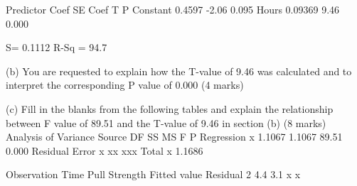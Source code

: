 	Predictor	Coef		SE Coef	T		P
	Constant			0.4597		-2.06		0.095
	Hours				0.09369	 9.46		0.000
	
	S= 0.1112	R-Sq = 94.7%
	
	
	(b) 	You are requested to explain how the T-value of 9.46 was calculated and to 
	interpret the corresponding P value of 0.000
	(4 marks)
	
	
	
	(c)	Fill in the blanks from the following tables and explain the relationship between F value of 89.51 and the T-value of 9.46 in section (b)
	(8 marks)
	Analysis of Variance
	Source			DF		SS		MS		F		P
	Regression		x		1.1067		1.1067		89.51		0.000
	Residual Error		x		xx		xxx		
	Total			x		1.1686
	
	
	
	Observation		Time		Pull Strength		Fitted value	Residual
	2			4.4		3.1			x		x
	
	

